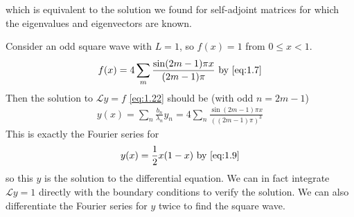    which is equivalent to the solution we found for self-adjoint matrices for which the eigenvalues and eigenvectors are known.
    \begin{example}
        Consider an odd square wave with $L = 1$, so $f(x) = 1$ from $0 \leq x < 1$.
        \begin{align*}
            f(x) = 4 \sum_m \frac{\sin(2m-1)\pi x}{(2m-1)\pi} \text{ by \cref{eq:1.7}}
        \end{align*}
        Then the solution to $\mathcal L y = f$ \cref{eq:1.22} should be (with odd $n = 2m-1$)
        \begin{align*}
            y(x) = \sum_n \frac{b_n}{\lambda_n} y_n = 4 \sum_n \frac{\sin (2m-1) \pi x}{((2m - 1) \pi)^3}
        \end{align*}
        This is exactly the Fourier series for
        \begin{align*}
            y(x) = \frac{1}{2}x(1-x) \text{ by \cref{eq:1.9}}
        \end{align*}
        so this $y$ is the solution to the differential equation.
        We can in fact integrate $\mathcal L y = 1$ directly with the boundary conditions to verify the solution.
        We can also differentiate the Fourier series for $y$ twice to find the square wave.
    \end{example}
